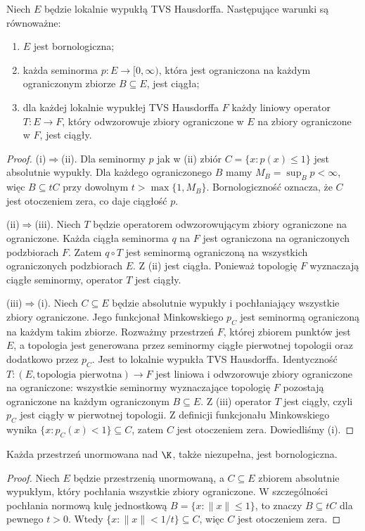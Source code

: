\begin{twierdzenie}\label{thm:bornological-equiv}
Niech $E$ będzie lokalnie wypukłą TVS Hausdorffa.
Następujące warunki są równoważne:
\begin{enumerate}[label=\textup{(\roman*)}]
\item $E$ jest bornologiczna;
\item każda seminorma $p:E\to[0,\infty)$, która jest
ograniczona na każdym ograniczonym zbiorze $B\subseteq E$,
jest ciągła;
\item dla każdej lokalnie wypukłej TVS Hausdorffa $F$
każdy liniowy operator $T:E\to F$, który odwzorowuje
zbiory ograniczone w $E$ na zbiory ograniczone w $F$,
jest ciągły.
\end{enumerate}
\end{twierdzenie}
\begin{proof}
(i)$\Rightarrow$(ii). Dla seminormy $p$ jak w (ii)
zbiór $C=\{x:p(x)\le1\}$ jest absolutnie wypukły.
Dla każdego ograniczonego $B$ mamy $M_B=\sup_Bp<\infty$,
więc $B\subseteq tC$ przy dowolnym $t>\max\{1,M_B\}$.
Bornologiczność oznacza, że $C$ jest otoczeniem zera,
co daje ciągłość $p$.

(ii)$\Rightarrow$(iii). Niech $T$ będzie operatorem
odwzorowującym zbiory ograniczone na ograniczone.
Każda ciągła seminorma $q$ na $F$ jest ograniczona
na ograniczonych podzbiorach $F$. Zatem $q\circ T$
jest seminormą ograniczoną na wszystkich ograniczonych
podzbiorach $E$. Z (ii) jest ciągła. Ponieważ topologię
$F$ wyznaczają ciągłe seminormy, operator $T$ jest ciągły.

(iii)$\Rightarrow$(i). Niech $C\subseteq E$ będzie
absolutnie wypukły i pochłaniający wszystkie zbiory
ograniczone. Jego funkcjonał Minkowskiego $p_C$
jest seminormą ograniczoną na każdym takim zbiorze.
Rozważmy przestrzeń $F$, której zbiorem punktów jest $E$,
a topologia jest generowana przez seminormy ciągłe
pierwotnej topologii oraz dodatkowo przez $p_C$.
Jest to lokalnie wypukła TVS Hausdorffa. Identyczność
$T:(E,\text{topologia pierwotna})\to F$ jest liniowa
i odwzorowuje zbiory ograniczone na ograniczone:
wszystkie seminormy wyznaczające topologię $F$
pozostają ograniczone na każdym ograniczonym $B\subseteq E$.
Z (iii) operator $T$ jest ciągły, czyli $p_C$ jest
ciągły w pierwotnej topologii. Z definicji funkcjonału
Minkowskiego wynika $\{x:p_C(x)<1\}\subseteq C$,
zatem $C$ jest otoczeniem zera. Dowiedliśmy (i).
\end{proof}

\begin{twierdzenie}
\label{thm:normed-bornological}
Każda przestrzeń unormowana nad $\K$, także niezupełna,
jest bornologiczna.
\end{twierdzenie}
\begin{proof}
Niech $E$ będzie przestrzenią unormowaną, a $C\subseteq E$
zbiorem absolutnie wypukłym, który pochłania wszystkie
zbiory ograniczone. W szczególności pochłania normową
kulę jednostkową $B=\{x:\|x\|\le1\}$, to znaczy
$B\subseteq tC$ dla pewnego $t>0$. Wtedy
$\{x:\|x\|<1/t\}\subseteq C$, więc $C$ jest
otoczeniem zera.
\end{proof}

